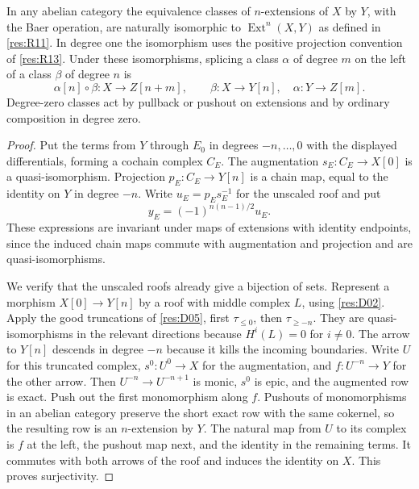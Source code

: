 \begin{theorem}\label{res:R15}
In any abelian category the equivalence classes of \(n\)-extensions
of \(X\) by \(Y\), with the Baer operation, are naturally isomorphic
to \(\operatorname{Ext}^n(X,Y)\) as defined in
\ref{res:R11}. In degree one the isomorphism uses the positive
projection convention of \ref{res:R13}. Under these isomorphisms,
splicing a class \(\alpha\) of degree \(m\) on the left of a class
\(\beta\) of degree \(n\) is
\[
       \alpha[n]\circ\beta:X\longrightarrow Z[n+m],
       \qquad
       \beta:X\longrightarrow Y[n],\quad
       \alpha:Y\longrightarrow Z[m].
\]
Degree-zero classes act by pullback or pushout on extensions and by
ordinary composition in degree zero.
\end{theorem}

\begin{proof}
Put the terms from \(Y\) through \(E_0\) in degrees \(-n,\ldots,0\)
with the displayed differentials, forming a cochain complex \(C_E\).
The augmentation \(s_E:C_E\to X[0]\) is a quasi-isomorphism.
Projection \(p_E:C_E\to Y[n]\) is a chain map, equal to the identity
on \(Y\) in degree \(-n\). Write \(u_E=p_Es_E^{-1}\) for the
unscaled roof and put
\[
             y_E=(-1)^{n(n-1)/2}u_E .
\]
These expressions are invariant under maps of extensions with
identity endpoints, since the induced chain maps commute with
augmentation and projection and are quasi-isomorphisms.

We verify that the unscaled roofs already give a bijection of sets.
Represent a morphism \(X[0]\to Y[n]\) by a roof with middle complex
\(L\), using \ref{res:D02}. Apply the good truncations of
\ref{res:D05}, first \(\tau_{\le0}\), then \(\tau_{\ge -n}\).
They are quasi-isomorphisms in the relevant directions because
\(H^i(L)=0\) for \(i\ne0\). The arrow to \(Y[n]\) descends in
degree \(-n\) because it kills the incoming boundaries. Write
\(U\) for this truncated complex, \(s^0:U^0\to X\) for the
augmentation, and \(f:U^{-n}\to Y\) for the other arrow.
Then \(U^{-n}\to U^{-n+1}\) is monic, \(s^0\) is epic,
and the augmented row is exact. Push out the first monomorphism
along \(f\). Pushouts of monomorphisms in an abelian category
preserve the short exact row with the same cokernel, so the
resulting row is an \(n\)-extension by \(Y\). The natural map
from \(U\) to its complex is \(f\) at the left, the pushout map
next, and the identity in the remaining terms. It commutes with
both arrows of the roof and induces the identity on \(X\).
This proves surjectivity.


\end{proof}
